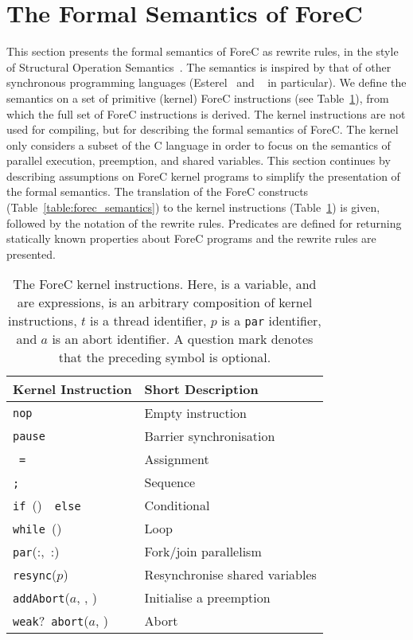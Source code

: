 \section{The Formal Semantics of ForeC}
\label{sec:formalSemantics}

This section presents the formal semantics of ForeC as rewrite rules,
in the style of Structural Operation Semantics~\cite{semantics_sos}. 
The semantics is inspired by that of other synchronous programming
languages (Esterel~\cite{EsterelV7} and \pretc{}~\cite{pret_pretc} in particular).
We define the semantics on a set of primitive (kernel) ForeC instructions
(see Table~\ref{table:forec_kernel}), from which the full set of ForeC 
instructions is derived. The kernel instructions are not used for compiling, 
but for describing the formal semantics of ForeC. The kernel only 
considers a subset of the C language in order to focus on the semantics 
of parallel execution, preemption, and shared variables. This section
continues by describing assumptions on ForeC kernel programs to 
simplify the presentation of the formal semantics. The translation of 
the ForeC constructs (Table~\ref{table:forec_semantics}) to the kernel 
instructions (Table~\ref{table:forec_kernel}) is given, followed by 
the notation of the rewrite rules. Predicates are defined for returning 
statically known properties about ForeC programs and the rewrite 
rules are presented.

\begin{table}[!h]
	\centering
	\renewcommand{\arraystretch}{1.25}
	
	\begin{tabular}{l l}
		\bf{Kernel Instruction}									& \bf{Short Description}		\\ \hline
		\verb$nop$												& Empty instruction				\\
		\verb$pause$											& Barrier synchronisation		\\
		\var{}~\verb$=$~\expression{}							& Assignment					\\
		\body{}\verb$;$~\body{}									& Sequence						\\
		\verb$if$~(\expression{})~\body{}~\verb$else$~\body{}	& Conditional					\\
		\verb$while$~(\expression{})~\body{}					& Loop							\\
		\verb$par$(\thread{}:\body{},~\thread{}:\body{})		& Fork/join parallelism			\\
		\verb$resync$($p$)										& Resynchronise shared variables\\
		\verb$addAbort$($a$, \imm{}, \expression{})				& Initialise a preemption		\\
		\verb$weak$?~\verb$abort$($a$, \body{})					& Abort							\\
	\end{tabular}
	
	\caption{The ForeC kernel instructions. Here, \var{} is a variable, 
			 \expression{} and \imm{} are expressions, \body{} is an arbitrary composition of kernel 
			 instructions, $t$ is a thread identifier, $p$ is a \texttt{par} identifier, and $a$ is an 
			 abort identifier. A question mark denotes that the preceding symbol is optional.}
	\label{table:forec_kernel}
\end{table}

